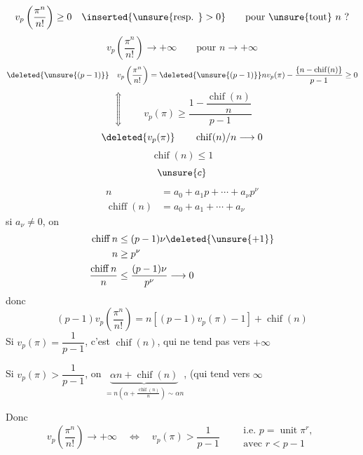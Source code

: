 \[
v_p\left(\frac{\pi^n}{n!}\right)\ge0\quad\inserted{\text{\unsure{resp. }} >0}\qquad\text{pour \unsure{tout} }n\ ?
\]
\[
v_p\left(\frac{\pi^n}{n!}\right)\longrightarrow+\infty\qquad\text{pour }n\longrightarrow+\infty
\]
\[
\deleted{\unsure{(p-1)}}\quad v_p\left(\frac{\pi^n}{n!}\right)=\deleted{\unsure{(p-1)}}n v_p(\pi)-\frac{\{n-\operatorname{chif}(n)\}}{p-1}\ge0
\]
\[
\Updownarrow\qquad v_p(\pi)\ge\frac{1-\dfrac{\operatorname{chif}(n)}{n}}{p-1}
\]
\[
\deleted{v_p(\pi)}\qquad\operatorname{chif}(n)/n\longrightarrow0
\]
\[
\operatorname{chif}(n)\le1
\]
\[\unsure{c}\]
\[
\begin{aligned}
n&=a_0+a_1p+\cdots+a_\nu p^\nu\\
\operatorname{chiff}(n)&=a_0+a_1+\cdots+a_\nu
\end{aligned}
\]
si $a_\nu\ne0$, on 
\[
\begin{aligned}
\operatorname{chiff}n&\le(p-1)\nu\deleted{\unsure{+1}}\\
n&\ge p^\nu\\
\frac{\operatorname{chiff}n}{n}&\le\frac{(p-1)\nu}{p^\nu}\longrightarrow0
\end{aligned}
\]
donc
\[
(p-1)v_p\left(\frac{\pi^n}{n!}\right)=n[(p-1)v_p(\pi)-1]+\operatorname{chif}(n)
\]
Si $v_p(\pi)=\dfrac1{p-1}$, c'est $\operatorname{chif}(n)$, qui ne tend pas vers $+\infty$

Si $v_p(\pi)>\dfrac1{p-1}$, on  $\underbrace{\alpha n+\operatorname{chif}(n)}_{\displaystyle =n\left(\alpha+\frac{\operatorname{chif}(n)}n\right)\sim\alpha n}$,  (qui tend vers $\infty$

Donc 
\[
\boxed{v_p\left(\frac{\pi^n}{n!}\right)\longrightarrow+\infty\quad\Longleftrightarrow\quad v_p(\pi)>\frac1{p-1}}
\qquad\boxed{\begin{gathered}\text{i.e. }p=\operatorname{unit}\pi^r,\\\text{avec }r<p-1\end{gathered}}
\]
